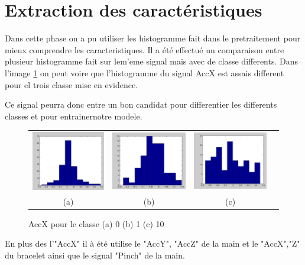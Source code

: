 \section*{Extraction des caractéristiques}
Dans cette phase on a pu utiliser les histogramme fait dans le pretraitement pour mieux comprendre les caracteristiques. Il a été effectué un comparaison entre plusieur histogramme fait sur lem'eme signal mais avec de classe differents. Dans l'image \ref{fig:histogram-pre} on peut voire que l'histogramme du signal AccX est assais different pour el trois classe mise en evidence.

Ce signal peurra donc entre un bon candidat pour differentier les differents classes et pour entrainernotre modele. 


\begin{figure}[h!]
    \centering
    \begin{tabular}{cccc}
      \includegraphics[width=.30\linewidth]{img/pretraitement/hist0.png} &
      \includegraphics[width=.30\linewidth]{img/pretraitement/hist1.png} &
      \includegraphics[width=.30\linewidth]{img/pretraitement/hist10.png} \\
      (a) & (b) & (c)\\
    \end{tabular}
    \caption{AccX pour le classe (a) 0 (b) 1 (c) 10
    \label{fig:histogram-pre}}
\end{figure}


En plus des l'"AccX" il à été utilise le "AccY", "AccZ" de la main et le "AccX","Z" du bracelet ainsi que le signal "Pinch" de la main.

